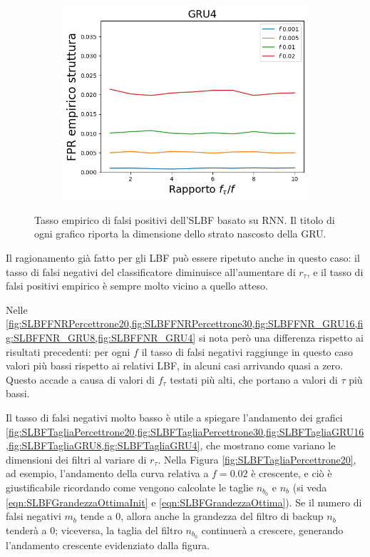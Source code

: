 \documentclass[../../main.tex]{subfiles}
\begin{document}
\begin{figure}[H]
        \begin{subfigure}[b]{0.49\textwidth}
            \centering
            \includegraphics[width = \textwidth]{immagini/7/SLBF/GRU4_FPR.png}
            \caption{}
            \label{fig:SLBFFPR_GRU4}
        \end{subfigure}
        \caption{Tasso empirico di falsi positivi dell'SLBF basato su RNN. Il titolo di ogni grafico riporta la dimensione dello strato nascosto della GRU.}
        \label{fig:SLBFFPR_GRU}
    \end{figure}

    Il ragionamento già fatto per gli LBF può essere ripetuto anche in questo caso: il tasso di falsi negativi del classificatore diminuisce all'aumentare di $r_{\tau}$, e il tasso di falsi positivi empirico è sempre molto vicino a quello atteso.

    Nelle \cref{fig:SLBFFNRPercettrone20,fig:SLBFFNRPercettrone30,fig:SLBFFNR_GRU16,fig:SLBFFNR_GRU8,fig:SLBFFNR_GRU4} si nota però una differenza rispetto ai risultati precedenti: per ogni $f$ il tasso di falsi negativi raggiunge in questo caso valori più bassi rispetto ai relativi LBF, in alcuni casi arrivando quasi a zero. Questo accade a causa di valori di $f_\tau$ testati più alti, che portano a valori di $\tau$ più bassi.

    Il tasso di falsi negativi molto basso è utile a spiegare l'andamento dei grafici \cref{fig:SLBFTagliaPercettrone20,fig:SLBFTagliaPercettrone30,fig:SLBFTagliaGRU16,fig:SLBFTagliaGRU8,fig:SLBFTagliaGRU4}, che mostrano come variano le dimensioni dei filtri al variare di $r_\tau$. Nella Figura \ref{fig:SLBFTagliaPercettrone20}, ad esempio, l'andamento della curva relativa a $f = 0.02$ è crescente, e ciò è giustificabile ricordando come vengono calcolate le taglie $n_{b_0}$ e $n_b$ (si veda \eqref{eqn:SLBFGrandezzaOttimaInit} e \eqref{eqn:SLBFGrandezzaOttima}). Se il numero di falsi negativi $m_b$ tende a 0, allora anche la grandezza del filtro di backup $n_b$ tenderà a 0; viceversa, la taglia del filtro $n_{b_0}$ continuerà a crescere, generando l'andamento crescente evidenziato dalla figura.
\end{document}
